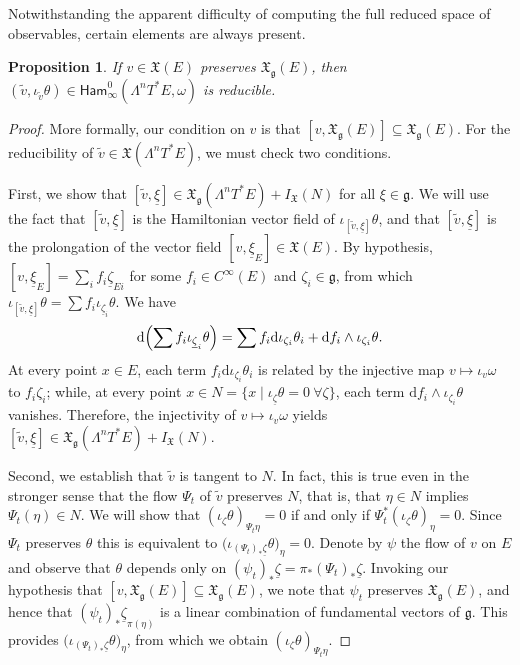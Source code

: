 \documentclass[pdftex]{sigma}
\numberwithin{equation}{section}
\newtheorem{Proposition}[Theorem]{Proposition}
 { \theoremstyle{definition}
\newtheorem{Definition}[Theorem]{Definition}
\newtheorem{Note}[Theorem]{Note}
\newtheorem{Example}[Theorem]{Example}
\newtheorem{Remark}[Theorem]{Remark} }
\newcommand{\g}{\mathfrak{g}}
\newcommand{\Ham}{\mathsf{Ham}}
\newcommand{\X}{\mathfrak{X}}
\renewcommand{\subset}{\subseteq}
\renewcommand{\d}{\mathrm{d}}
\begin{document}
Notwithstanding the apparent difficulty of computing the full reduced space of observables, certain elements are always present.

\begin{Proposition}\label{prop:reducible_observables_on_multicotangent_bundles}
	If $v\in\X(E)$ preserves $\X_\g(E)$, then $(\tilde v,\iota_{\tilde v}\theta)\in\Ham_\infty^0(\Lambda^nT^*E,\omega)$ is reducible.
\end{Proposition}

\begin{proof}
	More formally, our condition on $v$ is that $[v, \X_\g(E)]\subset \X_\g(E)$. For the reducibility of $\tilde v\in \X(\Lambda^nT^*E)$, we must check two conditions.
	
	First, we show that $[\tilde v, \underline \xi]\in \X_\g(\Lambda^nT^*E)+ I_\X(N)$ for all $\xi \in \g$. We will use the fact that $[\tilde v, \underline \xi]$ is the Hamiltonian vector field of $\iota_{[\tilde v, \underline \xi]}\theta$, and that $[\tilde v, \underline\xi]$ is the prolongation of the vector field  $[v, \underline\xi_E]\in \X(E)$. By hypothesis, $[v,\underline\xi_E] = \sum_i f_i\underline\zeta_{Ei}$ for some $f_i\in C^\infty(E)$ and $\zeta_i\in\g$, from which $\iota_{[\tilde v, \underline \xi]}\theta=\sum f_i\iota_{\underline \zeta_i}\theta$. We have
	\[
		\d\Bigl(\sum f_i\iota_{\underline\zeta_i}\theta\Bigr)=\sum f_i \d\iota_{\zeta_i}\theta_i +\d f_i\wedge \iota_{\zeta_i}\theta.
	\]
	At every point $x\in E$, each term $f_i\d\iota_{\zeta_i}\theta_i$ is related by the injective map $v\mapsto\iota_v\omega$ to $f_i \zeta_i$; while, at every point $x\in N=\{x\mid \iota_{\underline{\zeta}}\theta=0~\forall\zeta\}$, each term $\d f_i\wedge\iota_{\zeta_i}\theta$ vanishes. Therefore, the injectivity of $v\mapsto\iota_v\omega$ yields $[\tilde v, \underline \xi]\in \X_\g(\Lambda^nT^*E)+I_\X(N)$.
	
	Second, we establish that $\tilde v$ is tangent to $N$. In fact, this is true even in the stronger sense that the flow $\Psi_t$ of $\tilde v$ preserves $N$, that is, that $\eta\in N$ implies $\Psi_t(\eta)\in N$. We will show that $(\iota_\zeta\theta)_{\Psi_t\eta}=0$ if and only if $\Psi_t^* (\iota_\zeta\theta)_\eta=0$. Since $\Psi_t$ preserves $\theta$ this is equivalent to $ \bigl(\iota_{(\Psi_t)_*\underline{\zeta}}\theta\bigr)_{\eta}=0$. Denote by $\psi$ the flow of $v$ on $E$ and observe that $\theta$ depends only on $(\psi_{t})_*\underline{\zeta}=\pi_*(\Psi_{t})_*\underline{\zeta}$. Invoking our hypothesis that $[v, \X_\g(E)]\subset \X_\g(E)$, we note that $\psi_t$ preserves $\X_\g(E)$, and hence that ${(\psi_{t})_*\underline{\zeta}}_{\pi(\eta)}$ is a linear combination of fundamental vectors of $\g$. This provides $\bigl(\iota_{(\Psi_t)_*\underline{\zeta}}\theta\bigr)_{\eta}$, from which we obtain $(\iota_\zeta\theta)_{\Psi_t\eta}$.
	

\end{proof}
\end{document}
